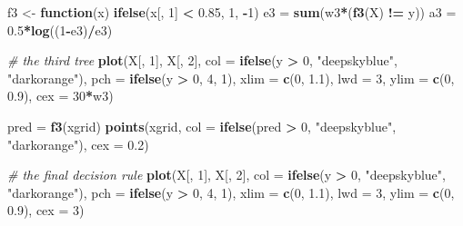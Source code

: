 \documentclass[
]{book}
\newenvironment{Shaded}{\begin{snugshade}}{\end{snugshade}}
\newcommand{\AttributeTok}[1]{\textcolor[rgb]{0.13,0.29,0.53}{#1}}
\newcommand{\CommentTok}[1]{\textcolor[rgb]{0.56,0.35,0.01}{\textit{#1}}}
\newcommand{\ControlFlowTok}[1]{\textcolor[rgb]{0.13,0.29,0.53}{\textbf{#1}}}
\newcommand{\DecValTok}[1]{\textcolor[rgb]{0.00,0.00,0.81}{#1}}
\newcommand{\FloatTok}[1]{\textcolor[rgb]{0.00,0.00,0.81}{#1}}
\newcommand{\FunctionTok}[1]{\textcolor[rgb]{0.13,0.29,0.53}{\textbf{#1}}}
\newcommand{\NormalTok}[1]{#1}
\newcommand{\OtherTok}[1]{\textcolor[rgb]{0.56,0.35,0.01}{#1}}
\newcommand{\SpecialCharTok}[1]{\textcolor[rgb]{0.81,0.36,0.00}{\textbf{#1}}}
\newcommand{\StringTok}[1]{\textcolor[rgb]{0.31,0.60,0.02}{#1}}
\theoremstyle{definition}
\theoremstyle{definition}
\theoremstyle{definition}
\theoremstyle{definition}
\theoremstyle{remark}
\begin{document}
\begin{Shaded}
\begin{Highlighting}[]
\NormalTok{  f3 }\OtherTok{\textless{}{-}} \ControlFlowTok{function}\NormalTok{(x) }\FunctionTok{ifelse}\NormalTok{(x[, }\DecValTok{1}\NormalTok{] }\SpecialCharTok{\textless{}} \FloatTok{0.85}\NormalTok{, }\DecValTok{1}\NormalTok{, }\SpecialCharTok{{-}}\DecValTok{1}\NormalTok{)}
\NormalTok{  e3 }\OtherTok{=} \FunctionTok{sum}\NormalTok{(w3}\SpecialCharTok{*}\NormalTok{(}\FunctionTok{f3}\NormalTok{(X) }\SpecialCharTok{!=}\NormalTok{ y))}
\NormalTok{  a3 }\OtherTok{=} \FloatTok{0.5}\SpecialCharTok{*}\FunctionTok{log}\NormalTok{((}\DecValTok{1}\SpecialCharTok{{-}}\NormalTok{e3)}\SpecialCharTok{/}\NormalTok{e3)}
  
  \CommentTok{\# the third tree}
  \FunctionTok{plot}\NormalTok{(X[, }\DecValTok{1}\NormalTok{], X[, }\DecValTok{2}\NormalTok{], }\AttributeTok{col =} \FunctionTok{ifelse}\NormalTok{(y }\SpecialCharTok{\textgreater{}} \DecValTok{0}\NormalTok{, }\StringTok{"deepskyblue"}\NormalTok{, }\StringTok{"darkorange"}\NormalTok{),}
       \AttributeTok{pch =} \FunctionTok{ifelse}\NormalTok{(y }\SpecialCharTok{\textgreater{}} \DecValTok{0}\NormalTok{, }\DecValTok{4}\NormalTok{, }\DecValTok{1}\NormalTok{), }\AttributeTok{xlim =} \FunctionTok{c}\NormalTok{(}\DecValTok{0}\NormalTok{, }\FloatTok{1.1}\NormalTok{), }\AttributeTok{lwd =} \DecValTok{3}\NormalTok{,}
       \AttributeTok{ylim =} \FunctionTok{c}\NormalTok{(}\DecValTok{0}\NormalTok{, }\FloatTok{0.9}\NormalTok{), }\AttributeTok{cex =} \DecValTok{30}\SpecialCharTok{*}\NormalTok{w3)}
  
\NormalTok{  pred }\OtherTok{=} \FunctionTok{f3}\NormalTok{(xgrid)}
  \FunctionTok{points}\NormalTok{(xgrid, }\AttributeTok{col =} \FunctionTok{ifelse}\NormalTok{(pred }\SpecialCharTok{\textgreater{}} \DecValTok{0}\NormalTok{, }\StringTok{"deepskyblue"}\NormalTok{, }\StringTok{"darkorange"}\NormalTok{), }
         \AttributeTok{cex =} \FloatTok{0.2}\NormalTok{)}
  
  \CommentTok{\# the final decision rule }
  \FunctionTok{plot}\NormalTok{(X[, }\DecValTok{1}\NormalTok{], X[, }\DecValTok{2}\NormalTok{], }\AttributeTok{col =} \FunctionTok{ifelse}\NormalTok{(y }\SpecialCharTok{\textgreater{}} \DecValTok{0}\NormalTok{, }\StringTok{"deepskyblue"}\NormalTok{, }\StringTok{"darkorange"}\NormalTok{),}
       \AttributeTok{pch =} \FunctionTok{ifelse}\NormalTok{(y }\SpecialCharTok{\textgreater{}} \DecValTok{0}\NormalTok{, }\DecValTok{4}\NormalTok{, }\DecValTok{1}\NormalTok{), }\AttributeTok{xlim =} \FunctionTok{c}\NormalTok{(}\DecValTok{0}\NormalTok{, }\FloatTok{1.1}\NormalTok{), }\AttributeTok{lwd =} \DecValTok{3}\NormalTok{,}
       \AttributeTok{ylim =} \FunctionTok{c}\NormalTok{(}\DecValTok{0}\NormalTok{, }\FloatTok{0.9}\NormalTok{), }\AttributeTok{cex =} \DecValTok{3}\NormalTok{)}
  

\end{Highlighting}
\end{Shaded}
\end{document}
